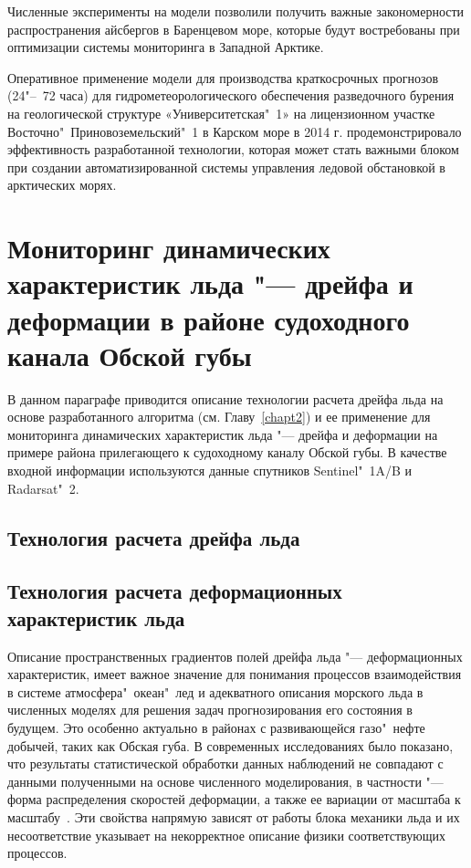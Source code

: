 Численные эксперименты на модели позволили получить важные закономерности распространения айсбергов в Баренцевом море, которые будут востребованы при оптимизации системы мониторинга в Западной Арктике.

Оперативное применение модели для производства краткосрочных прогнозов (24"--~72 часа) для гидрометеорологического обеспечения разведочного бурения на геологической структуре «Университетская"~1» на лицензионном участке Восточно"~Приновоземельский"~1 в Карском море в 2014 г. продемонстрировало эффективность разработанной технологии, которая может стать важными блоком при создании автоматизированной системы управления ледовой обстановкой в арктических морях.

\newpage

\section{Мониторинг динамических характеристик льда "--- дрейфа и деформации в районе судоходного канала Обской губы} \label{sect4_2}

В данном параграфе приводится описание технологии расчета дрейфа льда на основе разработанного алгоритма (см. Главу~\ref{chapt2}) и ее применение для мониторинга динамических характеристик льда "--- дрейфа и деформации на примере района прилегающего к судоходному каналу Обской губы. В качестве входной информации используются данные спутников Sentinel"~1A/B и Radarsat"~2.

\subsection{Технология расчета дрейфа льда} \label{subsect4_2_1}

\subsection{Технология расчета деформационных характеристик льда} \label{subsect4_2_2}

Описание пространственных градиентов полей дрейфа льда "--- деформационных характеристик, имеет важное значение для понимания процессов взаимодействия в системе атмосфера"~океан"~лед и адекватного описания морского льда в численных моделях для решения задач прогнозирования его состояния в будущем. Это особенно актуально в районах с развивающейся газо"~нефте добычей, таких как Обская губа. В современных исследованиях было показано, что результаты статистической обработки данных наблюдений не совпадают с данными полученными на основе численного моделирования, в частности "--- форма распределения скоростей деформации, а также ее вариации от масштаба к масштабу~\cite{girard2009evaluation}. Эти свойства напрямую зависят от работы блока механики льда и их несоответствие указывает на некорректное описание физики соответствующих процессов.

